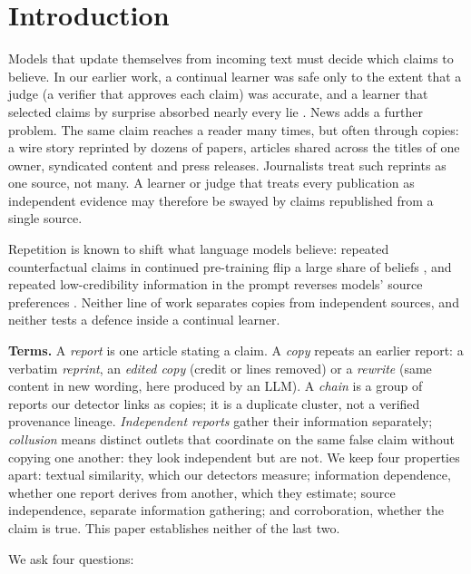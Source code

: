 \section{Introduction}\label{sec:intro}

Models that update themselves from incoming text must decide which claims to believe. In our earlier work, a continual learner was safe only to the extent that a judge (a verifier that approves each claim) was accurate, and a learner that selected claims by surprise absorbed nearly every lie \citep{metales2026surprise}. News adds a further problem. The same claim reaches a reader many times, but often through copies: a wire story reprinted by dozens of papers, articles shared across the titles of one owner, syndicated content and press releases. Journalists treat such reprints as one source, not many. A learner or judge that treats every publication as independent evidence may therefore be swayed by claims republished from a single source.

Repetition is known to shift what language models believe: repeated counterfactual claims in continued pre-training flip a large share of beliefs \citep{churina2025layer}, and repeated low-credibility information in the prompt reverses models' source preferences \citep{schuster2026whose}. Neither line of work separates copies from independent sources, and neither tests a defence inside a continual learner.

\textbf{Terms.} A \emph{report} is one article stating a claim. A \emph{copy} repeats an earlier report: a verbatim \emph{reprint}, an \emph{edited copy} (credit or lines removed) or a \emph{rewrite} (same content in new wording, here produced by an LLM). A \emph{chain} is a group of reports our detector links as copies; it is a duplicate cluster, not a verified provenance lineage. \emph{Independent reports} gather their information separately; \emph{collusion} means distinct outlets that coordinate on the same false claim without copying one another: they look independent but are not. We keep four properties apart: textual similarity, which our detectors measure; information dependence, whether one report derives from another, which they estimate; source independence, separate information gathering; and corroboration, whether the claim is true. This paper establishes neither of the last two.

We ask four questions:

